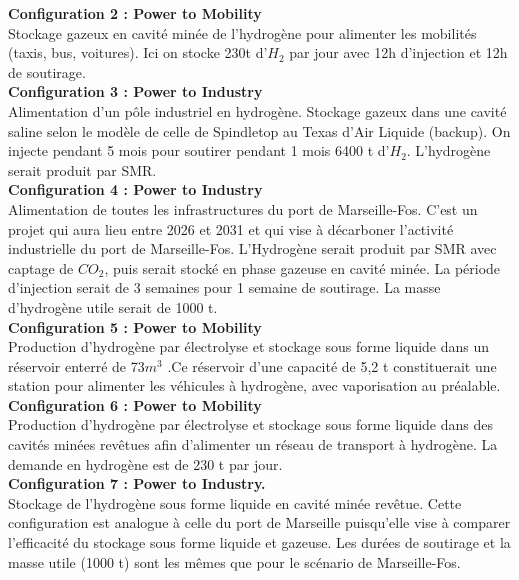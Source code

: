 \documentclass[11pt,french,a4paper]{article}
\begin{document}
\textbf{Configuration 2 :  Power to Mobility } \\
Stockage gazeux en cavité minée de l’hydrogène pour alimenter les mobilités (taxis, bus, voitures). Ici on stocke 230t d’$H_2$ par jour avec 12h d’injection et 12h de soutirage. \\
 
\textbf{Configuration 3 :  Power to Industry } \\
Alimentation d’un pôle industriel en hydrogène. Stockage gazeux dans une cavité saline selon le modèle de celle de Spindletop au Texas d'Air Liquide (backup). On injecte pendant 5 mois pour soutirer pendant 1 mois 6400 t d’$H_2$. L’hydrogène serait produit par SMR. \\

\textbf{Configuration 4 : Power to Industry }\\
Alimentation de toutes les infrastructures du port de Marseille-Fos. C’est un projet qui aura lieu entre 2026 et 2031 et qui vise à décarboner l’activité industrielle du port de Marseille-Fos. L’Hydrogène serait produit par SMR avec captage de $CO_2$, puis serait stocké en phase gazeuse en cavité minée. La période d’injection serait de 3 semaines pour 1 semaine de soutirage. La masse d’hydrogène utile serait de 1000 t. \\

\textbf{Configuration 5 :  Power to Mobility }\\
Production d'hydrogène par électrolyse et stockage sous forme liquide dans un réservoir enterré de 73$m^3$ .Ce réservoir d’une capacité de 5,2 t constituerait une station pour alimenter les véhicules à hydrogène, avec vaporisation au préalable. \\

\textbf{Configuration 6 : Power to Mobility}\\
Production d'hydrogène par électrolyse et stockage sous forme liquide dans des cavités minées revêtues afin d’alimenter un réseau de transport à hydrogène. La demande en hydrogène est de 230 t par jour.  \\

\textbf{Configuration 7 : Power to Industry. }\\
Stockage de l'hydrogène sous forme liquide en cavité minée revêtue. Cette configuration est analogue à celle du port de Marseille puisqu’elle vise à comparer l’efficacité du stockage sous forme liquide et gazeuse. Les durées de soutirage et la masse utile (1000 t) sont les mêmes que pour le scénario de Marseille-Fos.\\
\end{document}
